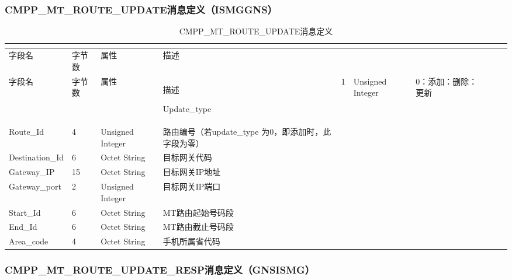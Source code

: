 \documentclass[11pt]{book} %
\begin{document}
%
%
%
%
%



\subsubsection{CMPP\_MT\_ROUTE\_UPDATE消息定义（ISMG\textrightarrow GNS）}


\begin{longtable}{|m{90pt}|m{35pt}|m{80pt}|m{200pt}|}
\tabularnewline\hline
字段名&字节数&属性&描述
\endhead

\caption{CMPP\_MT\_ROUTE\_UPDATE消息定义}\\
\hline
字段名&字节数&属性&描述
\endfirsthead

\endfoot

\endlastfoot

\hline
Update\_type&1&Unsigned Integer&0：添加：删除：更新\\
\hline
Route\_Id&4&Unsigned Integer&路由编号（若update\_type 为0，即添加时，此字段为零）\\
\hline
Destination\_Id&6&Octet String&目标网关代码\\
\hline
Gateway\_IP&15&Octet String&目标网关IP地址\\
\hline
Gateway\_port&2&Unsigned Integer&目标网关IP端口\\
\hline
Start\_Id&6&Octet String&MT路由起始号码段\\
\hline
End\_Id&6&Octet String&MT路由截止号码段\\
\hline
Area\_code&4&Octet String&手机所属省代码\\
\hline
\end{longtable}


\subsubsection{CMPP\_MT\_ROUTE\_UPDATE\_RESP消息定义（GNS\textrightarrow ISMG）}
\end{document}
